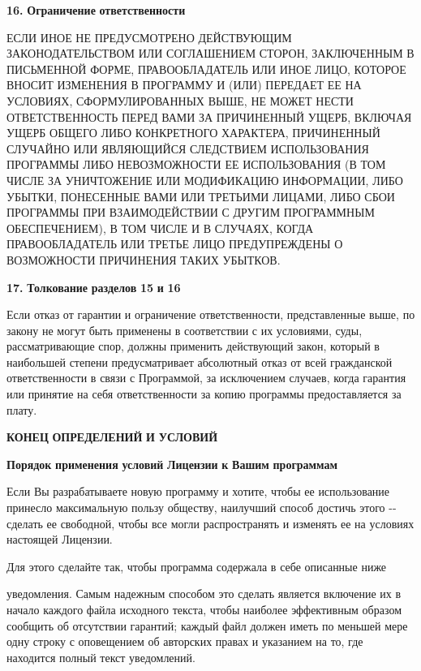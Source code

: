 {\bfseries{16.}} {\bfseries{Ограничение}} {\bfseries{ответственности}}

ЕСЛИ ИНОЕ НЕ ПРЕДУСМОТРЕНО ДЕЙСТВУЮЩИМ ЗАКОНОДАТЕЛЬСТВОМ ИЛИ СОГЛАШЕНИЕМ СТОРОН, ЗАКЛЮЧЕННЫМ В ПИСЬМЕННОЙ ФОРМЕ, ПРАВООБЛАДАТЕЛЬ ИЛИ ИНОЕ ЛИЦО, КОТОРОЕ ВНОСИТ ИЗМЕНЕНИЯ В ПРОГРАММУ И (ИЛИ) ПЕРЕДАЕТ ЕЕ НА УСЛОВИЯХ, СФОРМУЛИРОВАННЫХ ВЫШЕ, НЕ МОЖЕТ НЕСТИ ОТВЕТСТВЕННОСТЬ ПЕРЕД ВАМИ ЗА ПРИЧИНЕННЫЙ УЩЕРБ, ВКЛЮЧАЯ УЩЕРБ ОБЩЕГО ЛИБО КОНКРЕТНОГО ХАРАКТЕРА, ПРИЧИНЕННЫЙ СЛУЧАЙНО ИЛИ ЯВЛЯЮЩИЙСЯ СЛЕДСТВИЕМ ИСПОЛЬЗОВАНИЯ ПРОГРАММЫ ЛИБО НЕВОЗМОЖНОСТИ ЕЕ ИСПОЛЬЗОВАНИЯ (В ТОМ ЧИСЛЕ ЗА УНИЧТОЖЕНИЕ ИЛИ МОДИФИКАЦИЮ ИНФОРМАЦИИ, ЛИБО УБЫТКИ, ПОНЕСЕННЫЕ ВАМИ ИЛИ ТРЕТЬИМИ ЛИЦАМИ, ЛИБО СБОИ ПРОГРАММЫ ПРИ ВЗАИМОДЕЙСТВИИ С ДРУГИМ ПРОГРАММНЫМ ОБЕСПЕЧЕНИЕМ), В ТОМ ЧИСЛЕ И В СЛУЧАЯХ, КОГДА ПРАВООБЛАДАТЕЛЬ ИЛИ ТРЕТЬЕ ЛИЦО ПРЕДУПРЕЖДЕНЫ О ВОЗМОЖНОСТИ ПРИЧИНЕНИЯ ТАКИХ УБЫТКОВ.

{\bfseries{17.}} {\bfseries{Толкование}} {\bfseries{разделов}} {\bfseries{15}} {\bfseries{и}} {\bfseries{16}}

Если отказ от гарантии и ограничение ответственности, представленные выше, по закону не могут быть применены в соответствии с их условиями, суды, рассматривающие спор, должны применить действующий закон, который в наибольшей степени предусматривает абсолютный отказ от всей гражданской ответственности в связи с Программой, за исключением случаев, когда гарантия или принятие на себя ответственности за копию программы предоставляется за плату.

{\bfseries{КОНЕЦ}} {\bfseries{ОПРЕДЕЛЕНИЙ}} {\bfseries{И}} {\bfseries{УСЛОВИЙ}}

{\bfseries{Порядок}} {\bfseries{применения}} {\bfseries{условий}} {\bfseries{Лицензии}} {\bfseries{к}} {\bfseries{Вашим}} {\bfseries{программам}}

Если Вы разрабатываете новую программу и хотите, чтобы ее использование принесло максимальную пользу обществу, наилучший способ достичь этого -\/-\/ сделать ее свободной, чтобы все могли распространять и изменять ее на условиях настоящей Лицензии.

Для этого сделайте так, чтобы программа содержала в себе описанные ниже

уведомления. Самым надежным способом это сделать является включение их в начало каждого файла исходного текста, чтобы наиболее эффективным образом сообщить об отсутствии гарантий; каждый файл должен иметь по меньшей мере одну строку с оповещением об авторских правах и указанием на то, где находится полный текст уведомлений.

